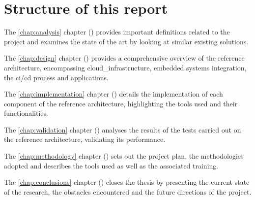 \section{Structure of this report}

The \ref{chap:analysis} chapter () provides important definitions related to the project and examines the state of the art by looking at similar existing solutions.

The \ref{chap:design} chapter () provides a comprehensive overview of the reference architecture, encompassing \gls{cloud_infrastructure}, embedded systems integration, the \acrshort{ci}/\acrshort{cd} process and applications.

The \ref{chap:implementation} chapter () details the implementation of each component of the reference architecture, highlighting the tools used and their functionalities.

The \ref{chap:validation} chapter () analyses the results of the tests carried out on the reference architecture, validating its performance.

The \ref{chap:methodology} chapter () sets out the project plan, the methodologies adopted and describes the tools used as well as the associated training.

The \ref{chap:conclusions} chapter () closes the thesis by presenting the current state of the research, the obstacles encountered and the future directions of the project.
